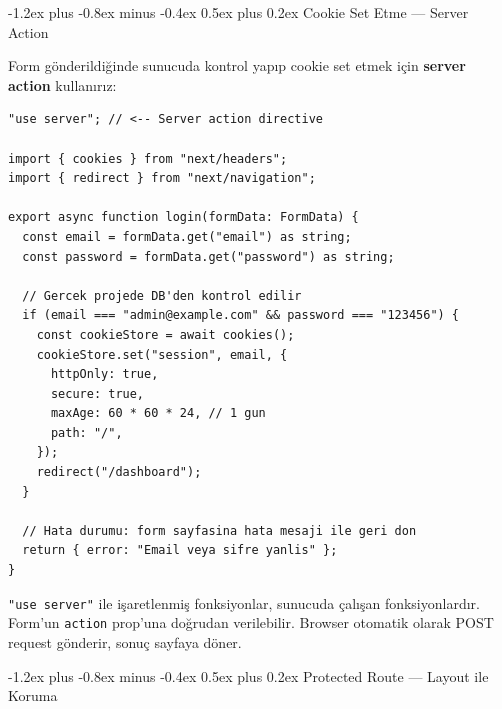 \documentclass[12pt, a4paper]{article}
\makeatletter
\renewcommand{\subsection}{%
  \@startsection{subsection}{2}{\z@}%
    {-1.2ex plus -0.8ex minus -0.4ex}%
    {0.5ex plus 0.2ex}%
    {\normalfont\large\bfseries\sffamily\color{secondary}}%
}
\makeatother
\begin{document}
\vspace{6pt}

\subsection{Cookie Set Etme --- Server Action}

Form gönderildiğinde sunucuda kontrol yapıp cookie set etmek için
\textbf{server action} kullanırız:

\vspace{6pt}

\begin{tcolorbox}[enhanced, colback=codebg, colframe=gray!30,
    colbacktitle=authcol!85!black, coltitle=white, arc=4pt,
    title={\sffamily\bfseries\small src/app/login/actions.ts}]
\begin{lstlisting}[style=jsxstyle]
"use server"; // <-- Server action directive

import { cookies } from "next/headers";
import { redirect } from "next/navigation";

export async function login(formData: FormData) {
  const email = formData.get("email") as string;
  const password = formData.get("password") as string;

  // Gercek projede DB'den kontrol edilir
  if (email === "admin@example.com" && password === "123456") {
    const cookieStore = await cookies();
    cookieStore.set("session", email, {
      httpOnly: true,
      secure: true,
      maxAge: 60 * 60 * 24, // 1 gun
      path: "/",
    });
    redirect("/dashboard");
  }

  // Hata durumu: form sayfasina hata mesaji ile geri don
  return { error: "Email veya sifre yanlis" };
}
\end{lstlisting}
\end{tcolorbox}

\vspace{6pt}

\begin{definebox}
\texttt{"use server"} ile işaretlenmiş fonksiyonlar, sunucuda çalışan
fonksiyonlardır. Form'un \texttt{action} prop'una doğrudan verilebilir.
Browser otomatik olarak POST request gönderir, sonuç sayfaya döner.
\end{definebox}

\subsection{Protected Route --- Layout ile Koruma}
\end{document}
